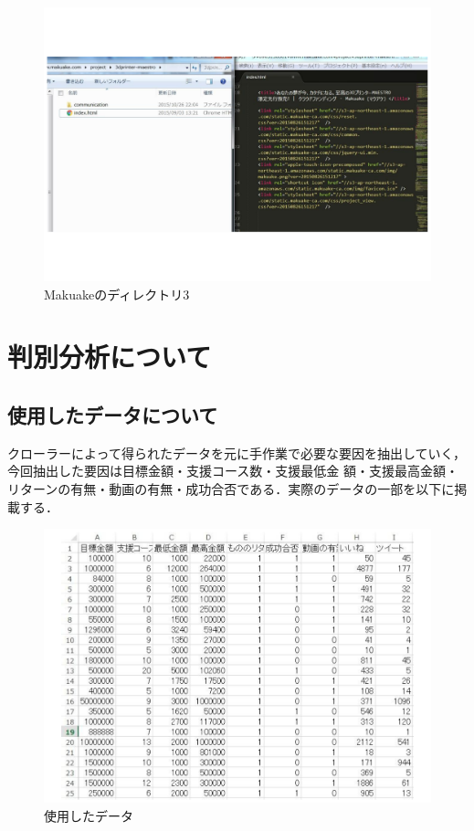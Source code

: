 \begin{figure}[H]
\centering
\includegraphics[width=13cm]{figure37.pdf}
\caption{Makuakeのディレクトリ3}\label{sannp}
\end{figure}




\chapter{判別分析について}

\section{使用したデータについて}

クローラーによって得られたデータを元に手作業で必要な要因を抽出していく，今回抽出した要因は目標金額・支援コース数・支援最低金
額・支援最高金額・リターンの有無・動画の有無・成功合否である．実際のデータの一部を以下に掲載する．

\begin{figure}[H]
\centering
\includegraphics[width=13cm]{figure18.pdf}
\caption{使用したデータ}\label{sannp}
\end{figure}

